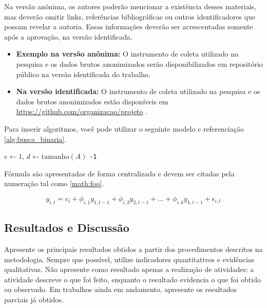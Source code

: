 \documentclass[a4paper, 12pt, twoside]{article}
\begin{document}
Na versão anônima, os autores poderão mencionar a existência desses materiais, mas deverão omitir links, referências bibliográficas ou outros identificadores que possam revelar a autoria. Essas informações deverão ser acrescentadas somente após a aprovação, na versão identificada.

\begin{itemize}
\item \textbf{Exemplo na versão anônima:} O instrumento de coleta utilizado na pesquisa e os dados brutos anonimizados serão disponibilizados em repositório público na versão identificada do trabalho.
\item \textbf{Na versão identificada:} O instrumento de coleta utilizado na pesquisa e os dados brutos anonimizados estão disponíveis em \url{https://github.com/organizacao/projeto} \cite{instrumento2026}.
\end{itemize}

Para inserir algoritmos, você pode utilizar o seguinte modelo e referenciação \ref{alg:busca_binaria}.

\begin{algorithm}[ht]
\caption{Busca Binária($A$, $x$)}
\label{alg:busca_binaria}
$e \leftarrow 1$,\; $d \leftarrow \mathrm{tamanho}(A)$\;
\Return \texttt{-1}\;
\end{algorithm}

Fórmula são apresentadas de forma centralizada e devem ser citadas pela numeração tal como \ref{math:foo}.

\begin{equation}
\label{math:foo}
y_{i,t} = c_i + \phi_{i,1}y_{1,t-1} + \phi_{i,2}y_{2,t-1} + \ldots + \phi_{i,k}y_{k,t-1} + \epsilon_{i,t}
\end{equation}

\subsection{Resultados e Discussão}

Apresente os principais resultados obtidos a partir dos procedimentos
descritos na metodologia. Sempre que possível, utilize indicadores
quantitativos e evidências qualitativas. Não apresente como resultado apenas a
realização de atividades: a atividade descreve o que foi feito, enquanto o
resultado evidencia o que foi obtido ou observado. Em trabalhos ainda em
andamento, apresente os resultados parciais já obtidos.
\end{document}
